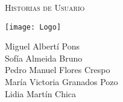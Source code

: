 \documentclass[11pt]{article}
\begin{document}
\begin{titlepage}
\centering
\vspace{4.5cm}
{\scshape\LARGE Historias de Usuario \par}
\vspace{1.5cm}

\texttt{[image: Logo]}

\vspace{3cm}
{\scshape\large \par}
\vspace{1cm}

{Miguel Albertí Pons\\
Sofía Almeida Bruno\\
Pedro Manuel Flores Crespo\\
María Victoria Granados Pozo\\
Lidia Martín Chica
\par}

\end{titlepage}
\newpage
\end{document}
